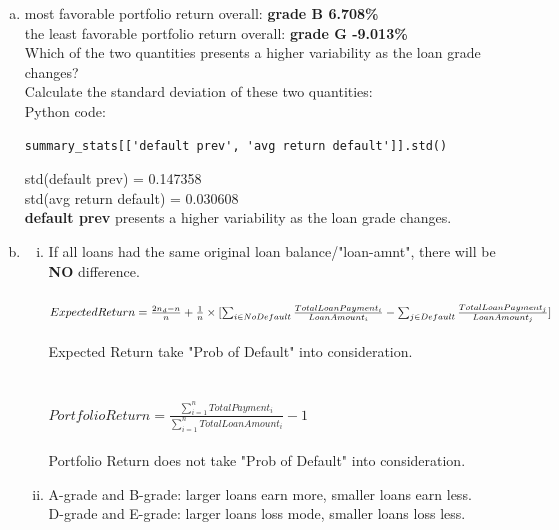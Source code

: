 \documentclass{article}
\begin{document}
\begin{enumerate}[(a)]
   \item most favorable portfolio return overall: \textbf{grade B 6.708\%}\\
   the least favorable portfolio return overall: \textbf{grade G -9.013\%}\\
  Which of the two quantities presents a higher variability as the loan grade changes? \\
  Calculate the standard deviation of these two quantities:\\
  Python code:
  \begin{verbatim}
summary_stats[['default prev', 'avg return default']].std()
\end{verbatim}
std(default prev) =         0.147358\\
std(avg return default) =    0.030608\\
\textbf{default prev} presents a higher variability as the loan grade changes.
 
   \item
   
   \begin{enumerate}[(i)]
\item If all loans had the same original loan balance/"loan-amnt", there will be \textbf{NO} difference. \\
\\
$Expected Return  =\\
 \frac{2n_d-n}{n}+\frac{1}{n}\times[\sum_{i \in No Default}\frac{Total LoanPayment_i}{LoanAmount_i}-\sum_{j \in Default}\frac{Total LoanPayment_j}{LoanAmount_j}]$\\
 \\
Expected Return take "Prob of Default" into consideration.
 \\
 \\
 \\
$Portfolio Return = \frac{\sum_{i=1}^{n}TotalPayment_i}{\sum_{i=1}^{n}TotalLoanAmount_i}-1$
 \\
 \\
 Portfolio Return does not take "Prob of Default" into consideration.

\item A-grade and B-grade: larger loans earn more, smaller loans earn less.\\
D-grade and E-grade: larger loans loss mode, smaller loans loss less.\\
\end{enumerate}


\end{enumerate}
\end{document}
